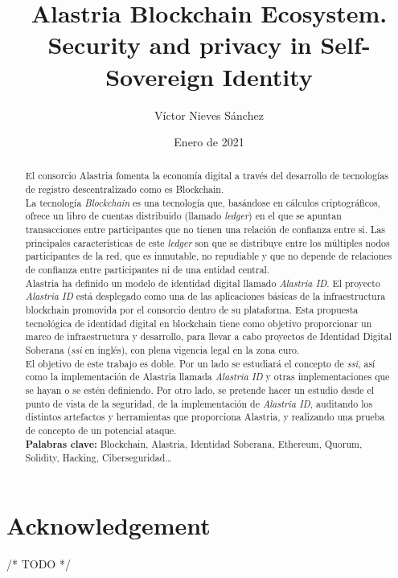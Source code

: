 \documentclass[a4paper, 12pt]{article} %
\author{Víctor Nieves Sánchez}
\date{Enero de 2021}
\title{Alastria Blockchain Ecosystem. Security and privacy in Self-Sovereign Identity}
\begin{document}
\maketitle
\null
\newpage

\section*{Acknowledgement}
    /* TODO */
\newpage

\tableofcontents
\newpage

\listoffigures
\newpage
\listoftables
\newpage
\lstlistoflistings
\newpage
\printglossary[type=\acronymtype]
\newpage

\begin{otherlanguage}{spanish}
    \renewcommand{\spanishabstractname}{Resumen}
    \begin{abstract}
        \normalsize
        El consorcio Alastria fomenta la economía digital a través del desarrollo de tecnologías de registro descentralizado como es Blockchain.\\
          
        La tecnología \textit{Blockchain} es una tecnología que, basándose en cálculos criptográficos, ofrece un libro de cuentas distribuido (llamado \textit{ledger}) en el que se apuntan transacciones entre participantes que no tienen una relación de confianza entre si. Las principales características de este \textit{ledger} son que se distribuye entre los múltiples nodos participantes de la red, que es inmutable, no repudiable y que no depende de relaciones de confianza entre participantes ni de una entidad central.\\
        
        Alastria ha definido un modelo de identidad digital llamado \textit{Alastria ID}. El proyecto \textit{Alastria ID} está desplegado como una de las aplicaciones básicas de la infraestructura blockchain promovida por el consorcio dentro de su plataforma. Esta propuesta tecnológica de identidad digital en blockchain tiene como objetivo proporcionar un marco de infraestructura y desarrollo, para llevar a cabo proyectos de Identidad Digital Soberana (\textit{\acrlong{ssi}} en inglés), con plena vigencia legal en la zona euro.\\
        
        El objetivo de este trabajo es doble. Por un lado se estudiará el concepto de \textit{\acrfull{ssi}}, así como la implementación de Alastria llamada \textit{Alastria ID} y otras implementaciones que se hayan o se estén definiendo. Por otro lado, se pretende hacer un estudio desde el punto de vista de la seguridad, de la implementación de \textit{Alastria ID}, auditando los distintos artefactos y herramientas que proporciona Alastria, y realizando una prueba de concepto de un potencial ataque.\\
        
        \textbf{Palabras clave:} Blockchain, Alastria, Identidad Soberana, Ethereum, Quorum, Solidity, Hacking, Ciberseguridad\ldots
    \end{abstract}
\end{otherlanguage}
\end{document}
